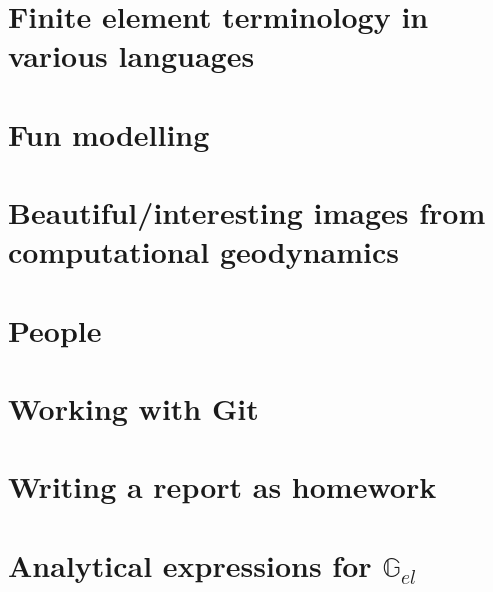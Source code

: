 \documentclass[a4paper]{article}
\numberwithin{equation}{section}
\newcommand{\G}{{\mathbb{G}}}
\begin{document}
\section{Finite element terminology in various languages}  %
\newpage %
\section{Fun modelling}  %
\newpage %
\section{Beautiful/interesting images from computational geodynamics}%
\newpage %
\section{People}%
\newpage %
\section{Working with Git} %
\newpage %
\section{Writing a report as homework} %
\newpage %
\section{Analytical expressions for $\G_{el}$} \label{app:Gel} %


\end{document}
